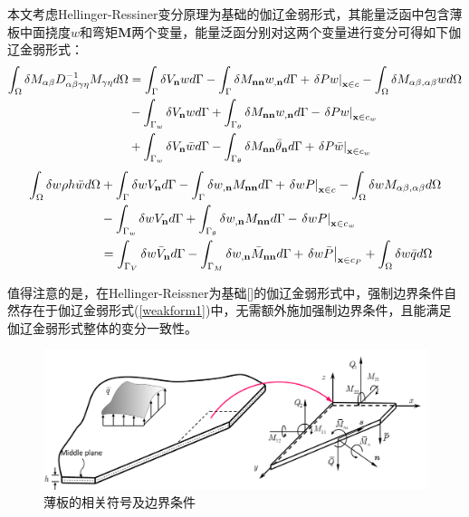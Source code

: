 \documentclass[a4paper]{article}
\begin{document}
本文考虑Hellinger-Ressiner变分原理为基础的伽辽金弱形式，其能量泛函中包含薄板中面挠度$w$和弯矩$\boldsymbol M$两个变量，能量泛函分别对这两个变量进行变分可得如下伽辽金弱形式：
\begin{equation}\label{weakform1}
    \begin{split}
        \int_\Omega {\delta {M_{\alpha \beta }}D_{\alpha \beta \gamma \eta }^{ - 1}{M_{\gamma \eta }}d\Omega }&=\int_\Gamma  {\delta {V_{\bf{n}}}wd\Gamma }  - \int_\Gamma  {\delta {M_{{\bf{nn}}}}{w_{,{\bf{n}}}}d\Gamma }+{\left. {\delta Pw} \right|_{{\bf{x}} \in c}} - \int_\Omega  {\delta {M_{\alpha \beta ,\alpha \beta }}wd\Omega } \\
        &-\int_{{\Gamma _w}} {\delta {V_{\bf{n}}}wd\Gamma }  + \int_{{\Gamma _\theta }} {\delta {M_{{\bf{nn}}}}{w_{,{\bf{n}}}}d\Gamma }  - {\left. {\delta Pw} \right|_{{\bf{x}} \in {c_w}}}\\
        &+\int_{{\Gamma _w}} {\delta {V_{\bf{n}}}\bar wd\Gamma }  - \int_{{\Gamma _\theta }} {\delta {M_{{\bf{nn}}}}{{\bar \theta }_{\bf{n}}}d\Gamma }  + {\left. {\delta P\bar w} \right|_{{\bf{x}} \in {c_w}}}
    \end{split}
\end{equation}
\begin{equation}
        \begin{split}
            \int_{\Omega}\delta w\rho h\ddot{w}d\Omega &+ \int_\Gamma  {\delta w{V_{\bf{n}}}d\Gamma } - \int_\Gamma  {\delta {w_{,{\bf{n}}}}{M_{{\bf{nn}}}}d\Gamma }  + {\left. {\delta wP} \right|_{{\bf{x}} \in c}} - \int_\Omega  {\delta w{M_{\alpha \beta ,\alpha\beta}}d\Omega }\\
            &- \int_{{\Gamma _w}} {\delta w{V_{\bf{n}}}d\Gamma }  + \int_{{\Gamma _\theta }} {\delta {w_{,{\bf{n}}}}{M_{{\bf{nn}}}}d\Gamma }  - {\left. {\delta wP} \right|_{{\bf{x}} \in {c_w}}}\\
            &= \int_{{\Gamma _V}} {\delta w{{\bar V}_{\bf{n}}}d\Gamma }  - \int_{{\Gamma _M}} {\delta {w_{,{\bf{n}}}}{{\bar M}_{{\bf{nn}}}}d\Gamma }  + {\left. {\delta w\bar P} \right|_{{\bf{x}} \in {c_P}}} + \int_\Omega  {\delta w\bar qd\Omega} 
    \end{split}
\end{equation} \par
值得注意的是，在Hellinger-Reissner为基础[]的伽辽金弱形式中，强制边界条件自然存在于伽辽金弱形式(\ref{weakform1})中，无需额外施加强制边界条件，且能满足伽辽金弱形式整体的变分一致性。
\begin{figure}[!h]
    \centering
    \includegraphics[scale=0.7]{firgure/boban.png}
    \caption{薄板的相关符号及边界条件}
\end{figure}\newpage
\end{document}
